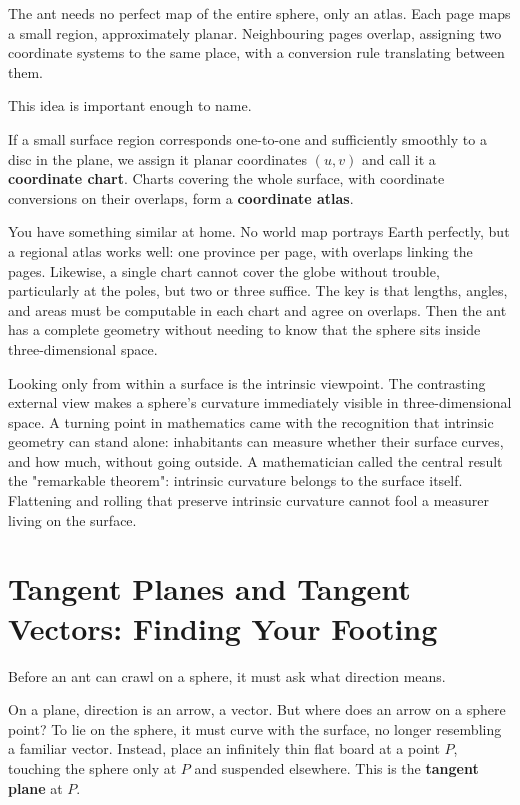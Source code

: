 The ant needs no perfect map of the entire sphere, only an atlas. Each page maps a small region, approximately planar. Neighbouring pages overlap, assigning two coordinate systems to the same place, with a conversion rule translating between them.

This idea is important enough to name.

\begin{dingyi}
If a small surface region corresponds one-to-one and sufficiently smoothly to a disc in the plane, we assign it planar coordinates $(u,v)$ and call it a \textbf{coordinate chart}. Charts covering the whole surface, with coordinate conversions on their overlaps, form a \textbf{coordinate atlas}.
\end{dingyi}

You have something similar at home. No world map portrays Earth perfectly, but a regional atlas works well: one province per page, with overlaps linking the pages. Likewise, a single chart cannot cover the globe without trouble, particularly at the poles, but two or three suffice. The key is that lengths, angles, and areas must be computable in each chart and agree on overlaps. Then the ant has a complete geometry without needing to know that the sphere sits inside three-dimensional space.

Looking only from within a surface is the intrinsic viewpoint. The contrasting external view makes a sphere's curvature immediately visible in three-dimensional space. A turning point in mathematics came with the recognition that intrinsic geometry can stand alone: inhabitants can measure whether their surface curves, and how much, without going outside. A mathematician called the central result the "remarkable theorem": intrinsic curvature belongs to the surface itself. Flattening and rolling that preserve intrinsic curvature cannot fool a measurer living on the surface.

\section{Tangent Planes and Tangent Vectors: Finding Your Footing}

Before an ant can crawl on a sphere, it must ask what direction means.

On a plane, direction is an arrow, a vector. But where does an arrow on a sphere point? To lie on the sphere, it must curve with the surface, no longer resembling a familiar vector. Instead, place an infinitely thin flat board at a point $P$, touching the sphere only at $P$ and suspended elsewhere. This is the \textbf{tangent plane} at $P$.


